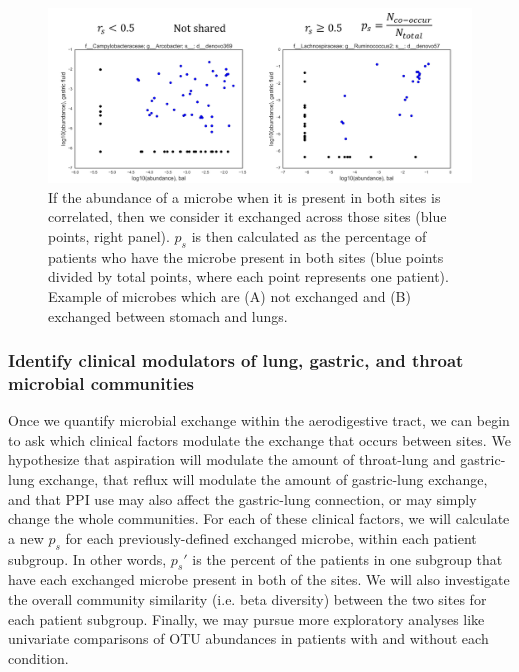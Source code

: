 \documentclass[12pt]{article}
\begin{document}
\begin{figure}
\begin{center}
    \includegraphics[scale=0.6]{sharedness_definition}
    \caption{If the abundance of a microbe when it is 
    present in both sites is correlated, then we consider it exchanged 
    across those sites (blue points, right panel). $p_s$ is then calculated as the 
    percentage of patients who have the microbe present in both sites (blue 
    points divided by total points, where each point represents one patient). 
    Example of microbes which are (A) not exchanged and (B) exchanged between stomach and lungs.}\label{fig:sharedness_defn}
\end{center}
\end{figure}

\subsubsection{Identify clinical modulators of lung, gastric, and throat microbial communities}
Once we quantify microbial exchange within the aerodigestive tract, we 
can begin to ask which clinical factors modulate the exchange 
that occurs between sites. We hypothesize that aspiration will modulate the 
amount of throat-lung and gastric-lung exchange, that reflux will modulate 
the amount of gastric-lung exchange, and that PPI use may also affect
the gastric-lung connection, or may simply change the whole communities.
For each of these clinical factors, we will calculate a new $p_s$ for 
each previously-defined exchanged microbe, within each patient subgroup.
In other words, $p_s'$ is the percent of the patients in one subgroup
that have each exchanged microbe present in both of the sites.
We will also investigate the overall community similarity (i.e. beta diversity) 
between the two sites for each patient subgroup. Finally, we may pursue
more exploratory analyses like univariate comparisons of OTU abundances
in patients with and without each condition.
\end{document}
